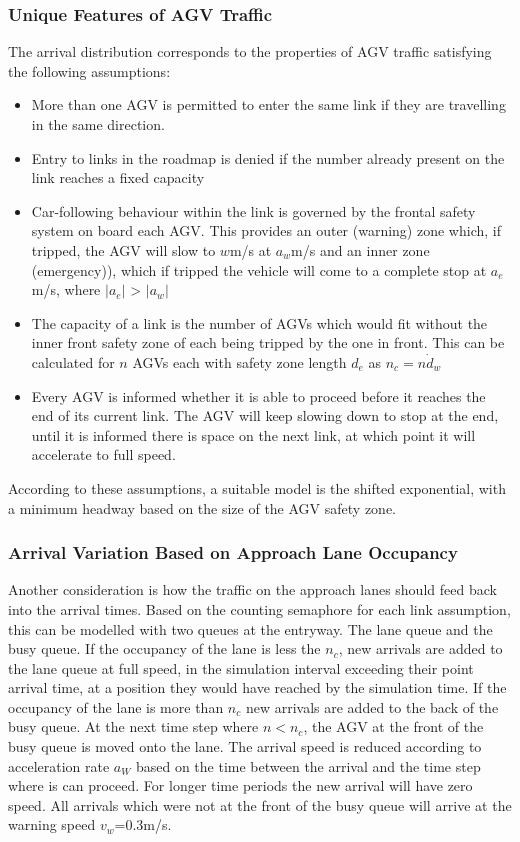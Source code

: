 \documentclass[]{article}
\begin{document}
\subsubsection{Unique Features of AGV Traffic}
The arrival distribution corresponds to the properties of AGV traffic satisfying the following assumptions:
\begin{itemize} 
	\item{More than one AGV is permitted to enter the same link if they are travelling in the same direction.}
	\item{Entry to links in the roadmap is denied if the number already present on the link reaches a fixed capacity}
	\item{Car-following behaviour within the link is governed by the frontal safety system on board each AGV. This provides an outer (warning) zone which, if tripped, the AGV will slow to $w$m/s at $a_w$m/s and an inner zone (emergency)), which if tripped the vehicle will come to a complete stop at $a_e$m/s, where $|a_e|$ > $|a_w|$}
	\item{The capacity of a link is the number of AGVs which would fit without the inner front safety zone of each being tripped by the one in front. This can be calculated for $n$ AGVs each with safety zone length $d_e$ as $n_c = n\dot d_w$}
	\item{Every AGV is informed whether it is able to proceed before it reaches the end of its current link. The AGV will keep slowing down to stop at the end, until it is informed there is space on the next link, at which point it will accelerate to full speed. }
\end{itemize}

According to these assumptions, a suitable model is the shifted exponential, with a minimum headway based on the size of the AGV safety zone. 

\subsubsection{Arrival Variation Based on Approach Lane Occupancy}
Another consideration is how the traffic on the approach lanes should feed back into the arrival times. Based on the counting semaphore for each link assumption, this can be modelled with two queues at the entryway. The lane queue and the busy queue. If the occupancy of the lane is less the $n_c$, new arrivals are added to the lane queue at full speed, in the simulation interval exceeding their point arrival time, at a position they would have reached by the simulation time. If the occupancy of the lane is more than $n_c$ new arrivals are added to the back of the busy queue. At the next time step where $n<n_c$, the AGV at the front of the busy queue is moved onto the lane. The arrival speed is reduced according to acceleration rate $a_W$ based on the time between the arrival and the time step where is can proceed. For longer time periods the new arrival will have zero speed. All arrivals which were not at the front of the busy queue will arrive at the warning speed $v_w$=0.3m/s. 
\end{document}
